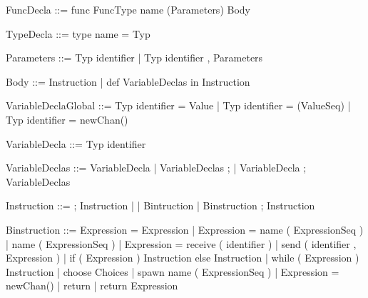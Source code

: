\documentclass[11pt]{report}
\begin{document}
\begin{verbnobox}[\normalfont]
FuncDecla ::= func FuncType name (Parameters) Body
\end{verbnobox}
\vspace*{3pt}

\begin{verbnobox}[\normalfont]
TypeDecla ::= type name = Typ
\end{verbnobox}
\vspace*{3pt}

\begin{verbnobox}[\normalfont]
Parameters ::= Typ identifier | Typ identifier , Parameters
\end{verbnobox}
\vspace*{3pt}

\begin{verbnobox}[\normalfont]
Body ::= { Instruction } | { def VariableDeclas in Instruction }
\end{verbnobox}
\vspace*{3pt}

\begin{verbnobox}[\normalfont]
VariableDeclaGlobal ::= Typ identifier = Value 
                            | Typ identifier = (ValueSeq)
                            | Typ identifier = newChan()
\end{verbnobox}
\vspace*{3pt}

\begin{verbnobox}[\normalfont]
VariableDecla ::= Typ identifier
\end{verbnobox}
\vspace*{3pt}

\begin{verbnobox}[\normalfont]
VariableDeclas ::= VariableDecla 
                    | VariableDeclas ; 
                    | VariableDecla ; VariableDeclas
\end{verbnobox}
\vspace*{3pt}

\begin{verbnobox}[\normalfont]
Instruction ::= ; Instruction
               |
               | Bintruction 
               | Binstruction ; Instruction
\end{verbnobox}
\vspace*{3pt}

\begin{verbnobox}[\normalfont]
Binstruction ::= Expression = Expression 
                 | Expression = name ( ExpressionSeq )
                 | name ( ExpressionSeq )
                 | Expression = receive ( identifier )
                 | send ( identifier , Expression )
                 | if ( Expression ) { Instruction } else { Instruction }
                 | while ( Expression ) { Instruction }
                 | choose { Choices }
                 | spawn name ( ExpressionSeq )
                 | Expression = newChan()
                 | return
                 | return Expression
\end{verbnobox}
\vspace*{3pt}
\end{document}
